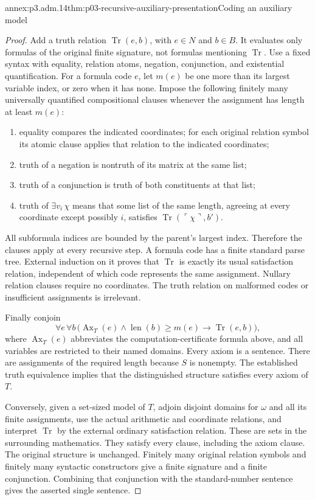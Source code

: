 \begin{annexitem}{annex:p3.adm.14}{thm:p03-recursive-auxiliary-presentation}{Coding an auxiliary model}
\begin{proof}
Add a truth relation \(\operatorname{Tr}(e,b)\), with \(e\in N\)
and \(b\in B\). It evaluates only formulas of the original finite
signature, not formulas mentioning \(\operatorname{Tr}\). Use a
fixed syntax with equality, relation atoms, negation, conjunction, and
existential quantification. For a formula code \(e\), let \(m(e)\)
be one more than its largest variable index, or zero when it has none.
Impose the following finitely many universally quantified compositional
clauses whenever the assignment has length at least \(m(e)\):
\begin{enumerate}
\item equality compares the indicated coordinates; for each original
      relation symbol its atomic clause applies that relation to the
      indicated coordinates;
\item truth of a negation is nontruth of its matrix at the same list;
\item truth of a conjunction is truth of both constituents at that list;
\item truth of \(\exists v_i\,\chi\) means that some list of the same
      length, agreeing at every coordinate except possibly \(i\),
      satisfies \(\operatorname{Tr}(\ulcorner\chi\urcorner,b')\).
\end{enumerate}
All subformula indices are bounded by the parent's largest index.
Therefore the clauses apply at every recursive step. A formula code
has a finite standard parse tree. External induction on it proves
that \(\operatorname{Tr}\) is exactly its usual satisfaction relation,
independent of which code represents the same assignment. Nullary
relation clauses require no coordinates. The truth relation on
malformed codes or insufficient assignments is irrelevant.

Finally conjoin
\[
 \forall e\,\forall b\,
 \bigl(\operatorname{Ax}_T(e)\land
       \operatorname{len}(b)\geq m(e)
       \longrightarrow\operatorname{Tr}(e,b)\bigr),
\]
where \(\operatorname{Ax}_T(e)\) abbreviates the computation-certificate
formula above, and all variables are restricted to their named domains.
Every axiom is a sentence. There are assignments of the required length
because \(S\) is nonempty. The established truth equivalence implies
that the distinguished structure satisfies every axiom of \(T\).

Conversely, given a set-sized model of \(T\), adjoin disjoint domains
for \(\omega\) and all its finite assignments, use the actual
arithmetic and coordinate relations, and interpret \(\operatorname{Tr}\)
by the external ordinary satisfaction relation. These are sets in the
surrounding mathematics. They satisfy every clause, including the axiom
clause. The original structure is unchanged. Finitely many original
relation symbols and finitely many syntactic constructors give a finite
signature and a finite conjunction. Combining that conjunction with
the standard-number sentence gives the asserted single sentence.


\end{proof}
\end{annexitem}
